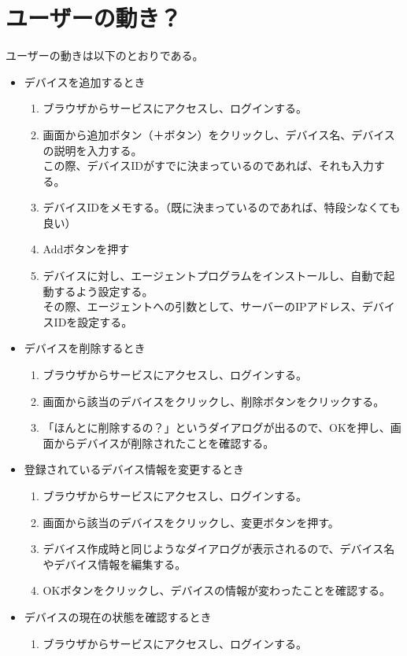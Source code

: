 \section{ユーザーの動き？}
ユーザーの動きは以下のとおりである。
\begin{itemize}
\item デバイスを追加するとき
	\begin{enumerate}
		\item ブラウザからサービスにアクセスし、ログインする。
		\item 画面から追加ボタン（＋ボタン）をクリックし、デバイス名、デバイスの説明を入力する。\\
			この際、デバイスIDがすでに決まっているのであれば、それも入力する。
		\item デバイスIDをメモする。（既に決まっているのであれば、特段シなくても良い）
		\item Addボタンを押す
		\item デバイスに対し、エージェントプログラムをインストールし、自動で起動するよう設定する。\\
			その際、エージェントへの引数として、サーバーのIPアドレス、デバイスIDを設定する。
	\end{enumerate}
\item デバイスを削除するとき
	\begin{enumerate}
		\item ブラウザからサービスにアクセスし、ログインする。
		\item 画面から該当のデバイスをクリックし、削除ボタンをクリックする。
		\item 「ほんとに削除するの？」というダイアログが出るので、OKを押し、画面からデバイスが削除されたことを確認する。
	\end{enumerate}
\item 登録されているデバイス情報を変更するとき
	\begin{enumerate}
		\item ブラウザからサービスにアクセスし、ログインする。
		\item 画面から該当のデバイスをクリックし、変更ボタンを押す。
		\item デバイス作成時と同じようなダイアログが表示されるので、デバイス名やデバイス情報を編集する。
		\item OKボタンをクリックし、デバイスの情報が変わったことを確認する。
	\end{enumerate}
\item デバイスの現在の状態を確認するとき
	\begin{enumerate}
		\item ブラウザからサービスにアクセスし、ログインする。

\end{enumerate}
\end{itemize}

